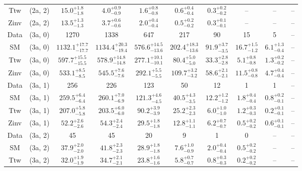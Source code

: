 \begin{table}[h!]
{\begin{tabular}{cccccccccc}
	Ttw & (2a, 2) & $15.0^{+ 1.8 }_{- 1.8 }$ & $4.0^{+ 0.9 }_{- 0.9 }$ & $1.6^{+ 0.8 }_{- 0.8 }$ & $0.6^{+ 0.4 }_{- 0.4 }$ & $0.3^{+ 0.2 }_{- 0.2 }$ & -- & -- & -- \\[0.5ex] 
	Zinv & (2a, 2) & $13.5^{+ 1.3 }_{- 1.3 }$ & $3.7^{+ 0.6 }_{- 0.6 }$ & $2.0^{+ 0.4 }_{- 0.4 }$ & $0.5^{+ 0.2 }_{- 0.2 }$ & $0.3^{+ 0.1 }_{- 0.1 }$ & -- & -- & -- \\[0.5ex] 
	Data & (3a, 0) & 1270 & 1338 & 647 & 217 & 90 & 15 & 5 & -- \\[0.5ex] 
	SM & (3a, 0) & $1132.1^{+ 17.7 }_{- 17.7 }$ & $1134.4^{+ 20.3 }_{- 19.4 }$ & $576.6^{+ 14.5 }_{- 13.6 }$ & $202.4^{+ 18.3 }_{- 13.6 }$ & $91.9^{+ 3.7 }_{- 3.5 }$ & $16.7^{+ 1.5 }_{- 1.2 }$ & $6.1^{+ 1.3 }_{- 0.4 }$ & -- \\[0.5ex] 
	Ttw & (3a, 0) & $597.7^{+ 15.5 }_{- 15.5 }$ & $578.9^{+ 14.8 }_{- 14.8 }$ & $277.1^{+ 10.1 }_{- 10.1 }$ & $80.4^{+ 5.0 }_{- 5.0 }$ & $33.3^{+ 2.8 }_{- 2.8 }$ & $5.1^{+ 0.8 }_{- 0.8 }$ & $1.3^{+ 0.2 }_{- 0.2 }$ & -- \\[0.5ex] 
	Zinv & (3a, 0) & $533.1^{+ 8.5 }_{- 8.5 }$ & $545.5^{+ 7.6 }_{- 7.6 }$ & $292.1^{+ 5.5 }_{- 5.5 }$ & $109.7^{+ 3.2 }_{- 3.2 }$ & $58.6^{+ 2.1 }_{- 2.1 }$ & $11.5^{+ 0.8 }_{- 0.8 }$ & $4.7^{+ 0.4 }_{- 0.4 }$ & -- \\[0.5ex] 
	Data & (3a, 1) & 256 & 226 & 123 & 50 & 12 & 1 & 1 & -- \\[0.5ex] 
	SM & (3a, 1) & $259.5^{+ 6.4 }_{- 6.4 }$ & $260.1^{+ 7.0 }_{- 6.9 }$ & $121.3^{+ 4.6 }_{- 4.5 }$ & $40.5^{+ 4.3 }_{- 3.5 }$ & $12.2^{+ 1.2 }_{- 1.2 }$ & $1.8^{+ 0.4 }_{- 0.4 }$ & $0.8^{+ 0.2 }_{- 0.1 }$ & -- \\[0.5ex] 
	Ttw & (3a, 1) & $207.0^{+ 5.8 }_{- 5.8 }$ & $203.5^{+ 6.0 }_{- 6.0 }$ & $90.2^{+ 3.9 }_{- 3.9 }$ & $25.2^{+ 2.3 }_{- 2.3 }$ & $6.0^{+ 1.0 }_{- 1.0 }$ & $1.2^{+ 0.3 }_{- 0.3 }$ & $0.2^{+ 0.1 }_{- 0.1 }$ & -- \\[0.5ex] 
	Zinv & (3a, 1) & $52.2^{+ 2.6 }_{- 2.6 }$ & $54.3^{+ 2.4 }_{- 2.4 }$ & $29.5^{+ 1.8 }_{- 1.8 }$ & $12.8^{+ 1.1 }_{- 1.1 }$ & $6.2^{+ 0.7 }_{- 0.7 }$ & $0.5^{+ 0.2 }_{- 0.2 }$ & $0.6^{+ 0.1 }_{- 0.1 }$ & -- \\[0.5ex] 
	Data & (3a, 2) & 45 & 45 & 20 & 9 & 1 & 0 & -- & -- \\[0.5ex] 
	SM & (3a, 2) & $37.9^{+ 2.0 }_{- 2.0 }$ & $41.8^{+ 2.3 }_{- 2.3 }$ & $28.9^{+ 1.8 }_{- 1.8 }$ & $7.6^{+ 1.0 }_{- 0.9 }$ & $2.0^{+ 0.4 }_{- 0.4 }$ & $0.5^{+ 0.2 }_{- 0.2 }$ & -- & -- \\[0.5ex] 
	Ttw & (3a, 2) & $32.0^{+ 1.9 }_{- 1.9 }$ & $34.7^{+ 2.1 }_{- 2.1 }$ & $23.8^{+ 1.6 }_{- 1.6 }$ & $5.8^{+ 0.7 }_{- 0.7 }$ & $0.8^{+ 0.3 }_{- 0.3 }$ & $0.2^{+ 0.2 }_{- 0.2 }$ & -- & -- \\[0.5ex] 

\end{tabular}}
\end{table}
